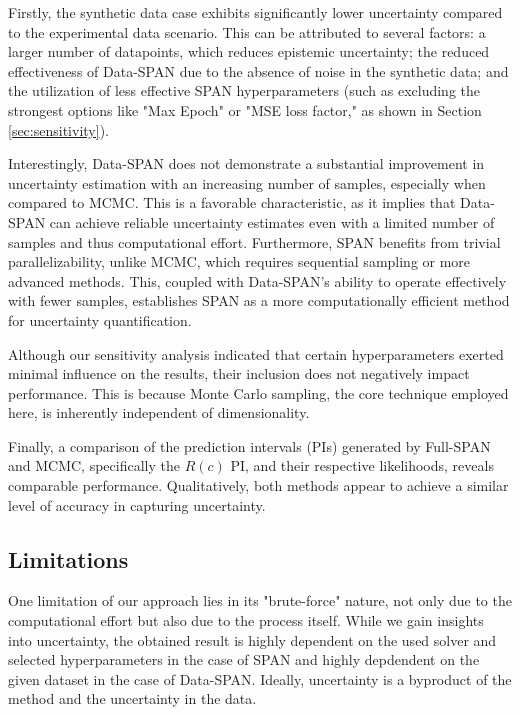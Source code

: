 \documentclass{article}
\begin{document}
Firstly, the synthetic data case exhibits significantly lower uncertainty compared to the experimental data scenario. This can be attributed to several factors: a larger number of datapoints, which reduces epistemic uncertainty; the reduced effectiveness of Data-SPAN due to the absence of noise in the synthetic data; and the utilization of less effective SPAN hyperparameters (such as excluding the strongest options like "Max Epoch" or "MSE loss factor," as shown in Section \ref{sec:sensitivity}).

Interestingly, Data-SPAN does not demonstrate a substantial improvement in uncertainty estimation with an increasing number of samples, especially when compared to MCMC. This is a favorable characteristic, as it implies that Data-SPAN can achieve reliable uncertainty estimates even with a limited number of samples and thus computational effort. Furthermore, SPAN benefits from trivial parallelizability, unlike MCMC, which requires sequential sampling or more advanced methods. This, coupled with Data-SPAN's ability to operate effectively with fewer samples, establishes SPAN as a more computationally efficient method for uncertainty quantification.

Although our sensitivity analysis indicated that certain hyperparameters exerted minimal influence on the results, their inclusion does not negatively impact performance. This is because Monte Carlo sampling, the core technique employed here, is inherently independent of dimensionality.

Finally, a comparison of the prediction intervals (PIs) generated by Full-SPAN and MCMC, specifically the $R(c)$ PI, and their respective likelihoods, reveals comparable performance. Qualitatively, both methods appear to achieve a similar level of accuracy in capturing uncertainty.




\subsection{Limitations}
One limitation of our approach lies in its "brute-force" nature, not only due to the computational effort but also due to the process itself. While we gain insights into uncertainty, the obtained result is highly dependent on the used solver and selected hyperparameters in the case of SPAN and highly depdendent on the given dataset in the case of Data-SPAN. Ideally, uncertainty is a byproduct of the method and the uncertainty in the data.
\end{document}
